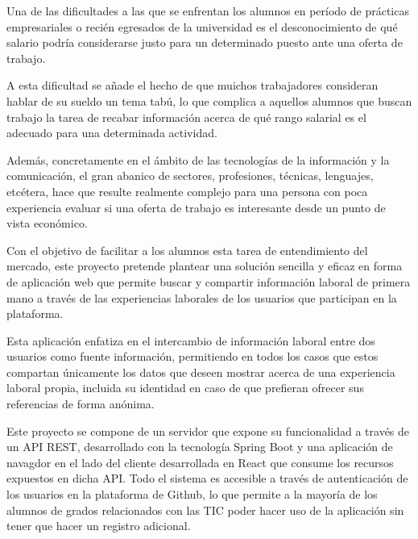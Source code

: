 \documentclass[a4paper, 12pt]{book}
\begin{document}
Una de las dificultades a las que se enfrentan los alumnos en período de prácticas empresariales o recién egresados de la universidad 
es el desconocimiento de qué salario podría considerarse justo para un determinado puesto ante una oferta de trabajo.

A esta dificultad se añade el hecho de que muichos trabajadores consideran hablar de su sueldo un tema tabú,
lo que complica a aquellos alumnos que buscan trabajo la tarea de recabar información acerca de qué rango salarial es el adecuado para una determinada actividad.

Además, concretamente en el ámbito de las tecnologías de la información y la comunicación, el gran abanico de sectores, profesiones, técnicas, lenguajes, etcétera, 
hace que resulte realmente complejo para una persona con poca experiencia evaluar si una oferta de trabajo es interesante desde un punto de vista económico.

Con el objetivo de facilitar a los alumnos esta tarea de entendimiento del mercado, este proyecto pretende plantear una solución sencilla y eficaz en forma de aplicación 
web que permite buscar y compartir información laboral de primera mano a través de las experiencias laborales de los usuarios que participan en la plataforma.

Esta aplicación enfatiza en el intercambio de información laboral entre dos usuarios como fuente información, permitiendo en todos los casos que estos compartan únicamente los datos que deseen mostrar acerca de una experiencia laboral propia, 
incluida su identidad en caso de que prefieran ofrecer sus referencias de forma anónima.

Este proyecto se compone de un servidor que expone su funcionalidad a través de un API REST, desarrollado con la tecnología Spring Boot y una aplicación de navagdor en el lado del cliente desarrollada en React que consume los recursos expuestos en dicha API. 
Todo el sistema es accesible a través de autenticación de los usuarios en la plataforma de Github, lo que permite a la mayoría de los alumnos de grados relacionados con las TIC poder hacer uso de la aplicación sin tener que hacer un registro adicional.


\tableofcontents 
\cleardoublepage
\listoffigures %
\end{document}
